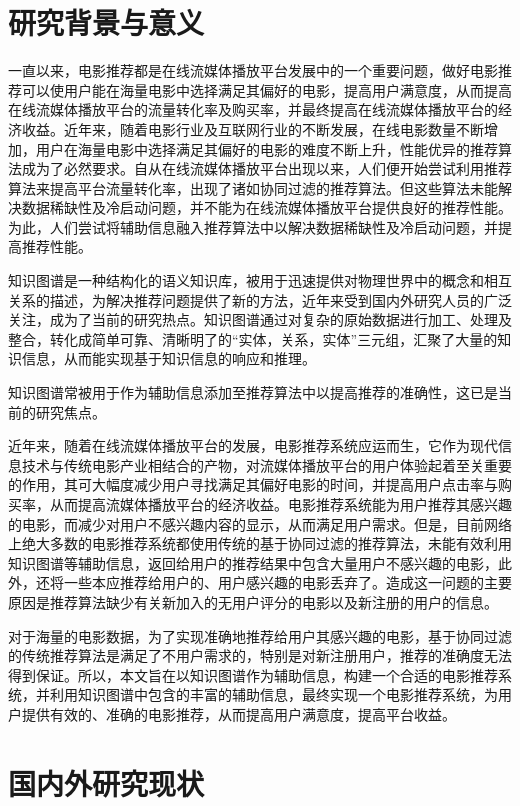 \documentclass{bjfuthesis}
\begin{document}
\section{研究背景与意义}
一直以来，电影推荐都是在线流媒体播放平台发展中的一个重要问题，做好电影推荐可以使用户能在海量电影中选择满足其偏好的电影，提高用户满意度，从而提高在线流媒体播放平台的流量转化率及购买率，并最终提高在线流媒体播放平台的经济收益。近年来，随着电影行业及互联网行业的不断发展，在线电影数量不断增加，用户在海量电影中选择满足其偏好的电影的难度不断上升，性能优异的推荐算法成为了必然要求。自从在线流媒体播放平台出现以来，人们便开始尝试利用推荐算法来提高平台流量转化率，出现了诸如协同过滤的推荐算法\cite{he2017neural}。但这些算法未能解决数据稀缺性及冷启动问题，并不能为在线流媒体播放平台提供良好的推荐性能。为此，人们尝试将辅助信息融入推荐算法中以解决数据稀缺性及冷启动问题\cite{sun2017collaborative}，并提高推荐性能。

知识图谱是一种结构化的语义知识库，被用于迅速提供对物理世界中的概念和相互关系的描述，为解决推荐问题提供了新的方法\cite{zou2020survey}，近年来受到国内外研究人员的广泛关注，成为了当前的研究热点。知识图谱通过对复杂的原始数据进行加工、处理及整合，转化成简单可靠、清晰明了的“实体，关系，实体”三元组，汇聚了大量的知识信息，从而能实现基于知识信息的响应和推理。

知识图谱常被用于作为辅助信息添加至推荐算法中以提高推荐的准确性，这已是当前的研究焦点。

近年来，随着在线流媒体播放平台的发展，电影推荐系统应运而生，它作为现代信息技术与传统电影产业相结合的产物，对流媒体播放平台的用户体验起着至关重要的作用，其可大幅度减少用户寻找满足其偏好电影的时间，并提高用户点击率与购买率，从而提高流媒体播放平台的经济收益。电影推荐系统能为用户推荐其感兴趣的电影，而减少对用户不感兴趣内容的显示，从而满足用户需求。但是，目前网络上绝大多数的电影推荐系统都使用传统的基于协同过滤的推荐算法，未能有效利用知识图谱等辅助信息，返回给用户的推荐结果中包含大量用户不感兴趣的电影，此外，还将一些本应推荐给用户的、用户感兴趣的电影丢弃了。造成这一问题的主要原因是推荐算法缺少有关新加入的无用户评分的电影以及新注册的用户的信息。

对于海量的电影数据，为了实现准确地推荐给用户其感兴趣的电影，基于协同过滤的传统推荐算法是满足了不用户需求的，特别是对新注册用户，推荐的准确度无法得到保证。所以，本文旨在以知识图谱作为辅助信息，构建一个合适的电影推荐系统，并利用知识图谱中包含的丰富的辅助信息，最终实现一个电影推荐系统，为用户提供有效的、准确的电影推荐，从而提高用户满意度，提高平台收益。
\section{国内外研究现状}
\end{document}
